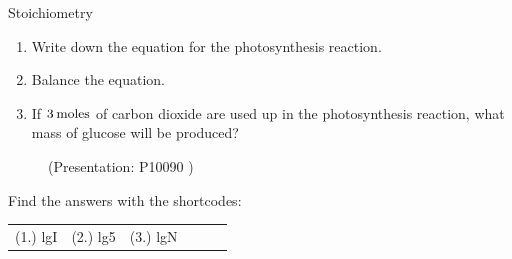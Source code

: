 \begin{exercises}{  Stoichiometry
      }
\begin{enumerate}[noitemsep, label=\textbf{\arabic*}. ]
\begin{enumerate}[noitemsep, label=\textbf{\alph*}. ]
            \label{m38712*uid104}\item Write down the equation for the photosynthesis reaction.
\label{m38712*uid105}\item Balance the equation.
\label{m38712*uid106}\item If $3\phantom{\rule{2pt}{0ex}}\mathrm{moles}$ of carbon dioxide are used up in the photosynthesis reaction, what mass of glucose will be produced?
\end{enumerate}
                \end{enumerate}
    \label{m38712*eip-269}
    \setcounter{subfigure}{0}
	\begin{figure}[H] %
    \label{m38712*slidesharemedia}\label{m38712*slideshareflash}
             { (Presentation:  P10090 )}
      \vspace{2pt}
    \vspace{.1in}
 \end{figure}       \par \label{m38712*cid10}
\par {} Find the answers with the shortcodes:
 \par \begin{tabular}[h]{cccccc}
 (1.) lgI  &  (2.) lg5  &  (3.) lgN  & \end{tabular}
\end{exercises}
